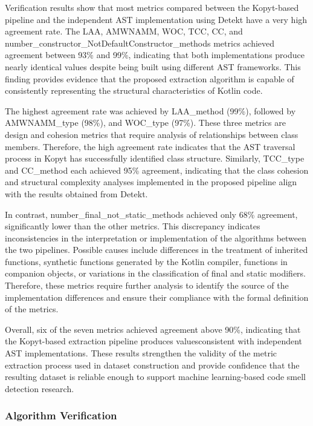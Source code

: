 \documentclass[]{einformatica}
\begin{document}
Verification results show that most metrics compared between the Kopyt-based pipeline and the independent AST implementation using Detekt have a very high agreement rate. The LAA, AMWNAMM, WOC, TCC, CC, and number\_constructor\_NotDefaultConstructor\_methods metrics achieved agreement between 93\% and 99\%, indicating that both implementations produce nearly identical values ​​despite being built using different AST frameworks. This finding provides evidence that the proposed extraction algorithm is capable of consistently representing the structural characteristics of Kotlin code.

The highest agreement rate was achieved by LAA\_method (99\%), followed by AMWNAMM\_type (98\%), and WOC\_type (97\%). These three metrics are design and cohesion metrics that require analysis of relationships between class members. Therefore, the high agreement rate indicates that the AST traversal process in Kopyt has successfully identified class structure. Similarly, TCC\_type and CC\_method each achieved 95\% agreement, indicating that the class cohesion and structural complexity analyses implemented in the proposed pipeline align with the results obtained from Detekt.

In contrast, number\_final\_not\_static\_methods achieved only 68\% agreement, significantly lower than the other metrics. This discrepancy indicates inconsistencies in the interpretation or implementation of the algorithms between the two pipelines. Possible causes include differences in the treatment of inherited functions, synthetic functions generated by the Kotlin compiler, functions in companion objects, or variations in the classification of final and static modifiers. Therefore, these metrics require further analysis to identify the source of the implementation differences and ensure their compliance with the formal definition of the metrics.

Overall, six of the seven metrics achieved agreement above 90\%, indicating that the Kopyt-based extraction pipeline produces values ​​consistent with independent AST implementations. These results strengthen the validity of the metric extraction process used in dataset construction and provide confidence that the resulting dataset is reliable enough to support machine learning-based code smell detection research.

\subsubsection{Algorithm Verification}
\end{document}
